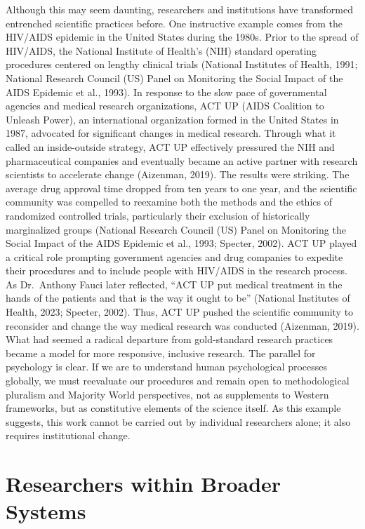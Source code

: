 \documentclass[
  11pt,
]{book}
\begin{document}
Although this may seem daunting, researchers and institutions have transformed entrenched scientific practices before. One instructive example comes from the HIV/AIDS epidemic in the United States during the 1980s. Prior to the spread of HIV/AIDS, the National Institute of Health's (NIH) standard operating procedures centered on lengthy clinical trials (National Institutes of Health, 1991; National Research Council (US) Panel on Monitoring the Social Impact of the AIDS Epidemic et al., 1993). In response to the slow pace of governmental agencies and medical research organizations, ACT UP (AIDS Coalition to Unleash Power), an international organization formed in the United States in 1987, advocated for significant changes in medical research. Through what it called an inside-outside strategy, ACT UP effectively pressured the NIH and pharmaceutical companies and eventually became an active partner with research scientists to accelerate change (Aizenman, 2019). The results were striking. The average drug approval time dropped from ten years to one year, and the scientific community was compelled to reexamine both the methods and the ethics of randomized controlled trials, particularly their exclusion of historically marginalized groups (National Research Council (US) Panel on Monitoring the Social Impact of the AIDS Epidemic et al., 1993; Specter, 2002). ACT UP played a critical role prompting government agencies and drug companies to expedite their procedures and to include people with HIV/AIDS in the research process. As Dr.~Anthony Fauci later reflected, ``ACT UP put medical treatment in the hands of the patients and that is the way it ought to be'' (National Institutes of Health, 2023; Specter, 2002). Thus, ACT UP pushed the scientific community to reconsider and change the way medical research was conducted (Aizenman, 2019). What had seemed a radical departure from gold-standard research practices became a model for more responsive, inclusive research. The parallel for psychology is clear. If we are to understand human psychological processes globally, we must reevaluate our procedures and remain open to methodological pluralism and Majority World perspectives, not as supplements to Western frameworks, but as constitutive elements of the science itself. As this example suggests, this work cannot be carried out by individual researchers alone; it also requires institutional change.

\section{Researchers within Broader Systems}\label{researchers-within-broader-systems}
\end{document}
